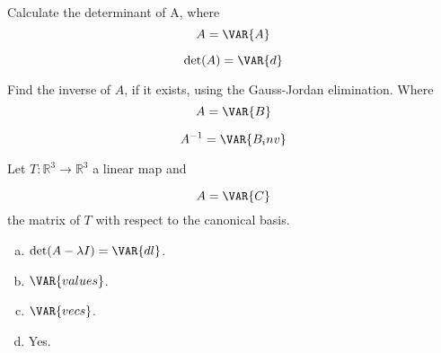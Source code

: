 
\begin{center}
\end{center}

\begin{questions}

\question Calculate the determinant of A, where
$$
A=\VAR{A}
$$

\begin{solution}
$$\det(A)=\VAR{d}$$
\end{solution}

\question Find the inverse of $A$, if it exists, using the Gauss-Jordan elimination. Where
$$
A=\VAR{B}
$$

\begin{solution}
$$A^{-1}=\VAR{B_inv}$$
\end{solution}

\question Let $T:\mathbb{R}^3\rightarrow\mathbb{R}^3$  a linear map and
 
$$
A=\VAR{C}
$$
the matrix of $T$ with respect to the canonical basis.
\begin{solution}
\begin{enumerate}[(a)]
\item $\det(A-\lambda I)=\VAR{dl}$.
\item $\VAR{values}$.
\item $\VAR{vecs}$.
\item Yes.
\end{enumerate}
\end{solution}

\end{questions}

\newpage


